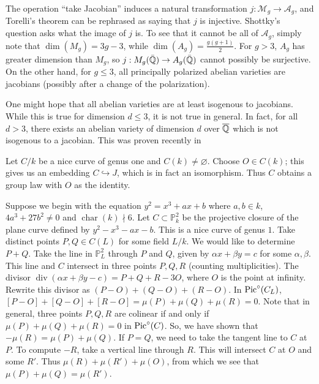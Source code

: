 \documentclass{article}
\begin{document}
The operation ``take Jacobian'' induces a natural transformation 
$j:\mathcal{M}_g\to\mathcal{A}_g$, and Torelli's theorem can be rephrased as 
saying that $j$ is injective. Shottky's question asks what the image of $j$ is. 
To see that it cannot be all of $\mathcal{A}_g$, simply note that 
$\dim(M_g) = 3 g - 3$, while $\dim(A_g) = \frac{g(g+1)}{2}$. For 
$g>3$, $A_g$ has greater dimension than $M_g$, so 
$j:M_g(\bar{\mathbb{Q}})\to A_g(\bar{\mathbb{Q}})$ cannot possibly be surjective. On the other 
hand, for $g\leqslant 3$, all principally polarized abelian varieties are 
jacobians (possibly after a change of the polarization). 

One might hope that all abelian varieties are at least isogenous to jacobians. 
While this is true for dimension $d\leqslant 3$, it is not true in general. 
In fact, for all $d>3$, there exists an abelian variety of dimension $d$ over 
$\overline{\mathbb{Q}}$ which is not isogenous to a jacobian. This was proven 
recently in \cite{ts12}

\begin{example}
Let $C/k$ be a nice curve of genus one and $C(k)\ne\varnothing$. Choose 
$O\in C(k)$; this gives us an embedding $C\hookrightarrow J$, which is in fact 
an isomorphism. Thus $C$ obtains a group law with $O$ as the identity. 

Suppose we begin with the equation $y^2=x^3 + a x+b$ where $a,b\in k$, 
$4 a^3+27 b^2\ne 0$ and $\operatorname{char}(k)\nmid 6$. Let 
$C\subset \mathbb{P}_k^2$ be the projective closure of the plane curve defined 
by $y^2-x^3-a x-b$. This is a nice curve of genus $1$. Take distinct points 
$P,Q\in C(L)$ for some field $L/k$. We would like to determine $P+Q$. Take the 
line in $\mathbb{P}_L^2$ through $P$ and $Q$, given by $\alpha x+\beta y = c$ 
for some $\alpha,\beta$. This line and $C$ intersect in three points $P,Q,R$ 
(counting multiplicities). The divisor 
$\operatorname{div}(\alpha x+\beta y - c) = P+Q+R - 3 O$, where $O$ is the 
point at infinity. Rewrite this divisor as $(P-O)+(Q-O)+(R-O)$. In 
$\operatorname{Pic}^\circ(C_L)$, $[P-O] + [Q-O] + [R-O] = \mu(P)+\mu(Q)+\mu(R) = 0$. Note 
that in general, three points $P,Q,R$ are colinear if and only if 
$\mu(P)+\mu(Q)+\mu(R) = 0$ in $\operatorname{Pic}^\circ(C)$. So, we have shown that 
$-\mu(R) = \mu(P)+\mu(Q)$. If $P=Q$, we need to take the tangent line to $C$ at 
$P$. To compute $-R$, take a vertical line through $R$. This will intersect 
$C$ at $O$ and some $R'$. Thus $\mu(R)+\mu(R')+\mu(O)$, from which we see that 
$\mu(P)+\mu(Q) = \mu(R')$. 
\end{example}
\end{document}
